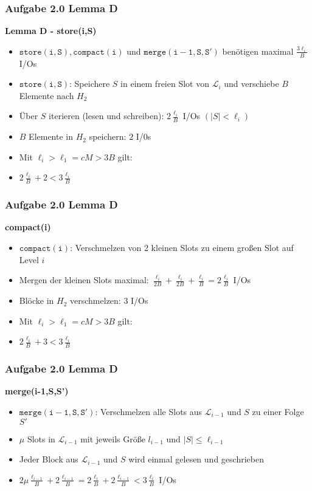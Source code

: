 \documentclass[aspectratio=169]{beamer}
\begin{document}
\begin{frame}
\frametitle{Aufgabe 2.0 Lemma D}

\textbf{Lemma D - store(i,S)}
\begin{itemize}
	\item $\mathtt{store(i,S), compact(i)}$ und $\mathtt{merge(i-1,S,S')}$ benötigen maximal $\frac{3\ell_i}{B}$ I/Os
	\item $\mathtt{store(i,S)}$: Speichere $S$ in einem freien Slot von $\mathcal{L}_i$ und verschiebe $B$ Elemente nach $H_2$
	\item Über $S$ iterieren (lesen und schreiben): $2\frac{\ell_i}{B}$ I/Os $(|S| < \ell_i)$
	\item $B$ Elemente in $H_2$ speichern: $2$ I/0s
	\item Mit $\ell_i > \ell_1 = cM > 3B$ gilt:
	\item $2\frac{\ell_i}{B} + 2 < 3\frac{\ell_i}{B}$
	
\end{itemize}

\end{frame}

\begin{frame}
\frametitle{Aufgabe 2.0 Lemma D}

\textbf{compact(i)}
\begin{itemize}
	\item $\mathtt{compact(i)}$: Verschmelzen von 2 kleinen Slots zu einem großen Slot auf Level $i$
	\item Mergen der kleinen Slots maximal: $\frac{\ell_i}{2B} + \frac{\ell_i}{2B} + \frac{\ell_i}{B} = 2\frac{\ell_i}{B}$ I/Os
	\item Blöcke in $H_2$ verschmelzen: $3$ I/Os
	\item Mit $\ell_i > \ell_1 = cM > 3B$ gilt:
	\item $2\frac{\ell_i}{B} + 3 < 3\frac{\ell_i}{B}$
\end{itemize}

\end{frame}

\begin{frame}
\frametitle{Aufgabe 2.0 Lemma D}

\textbf{merge(i-1,S,S')}
\begin{itemize}
	\item $\mathtt{merge(i-1,S,S')}$: Verschmelzen alle Slots aus $\mathcal{L}_{i-1}$ und $S$ zu einer Folge $S'$
	\item $\mu$ Slots in $\mathcal{L}_{i-1}$ mit jeweils Größe $l_{i-1}$ und $|S| \leq  \ell_{i-1}$
	\item Jeder Block aus $\mathcal{L}_{i-1}$ und $S$ wird einmal gelesen und geschrieben 
	\item $2\mu\frac{\ell_{i-1}}{B} + 2\frac{\ell_{i-1}}{B} = 2\frac{\ell_{i}}{B} + 2\frac{\ell_{i-1}}{B} < 3\frac{\ell_i}{B}$ I/Os
\end{itemize}

\end{frame}
\end{document}

